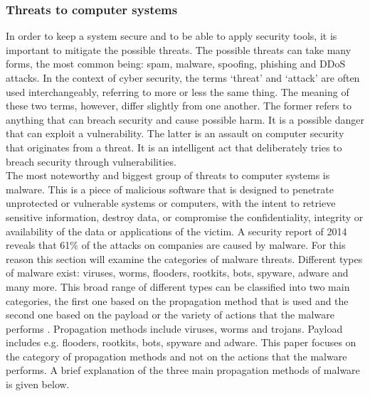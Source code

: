 \subsubsection{Threats to computer systems}


In order to keep a system secure and to be able to apply security tools, it is important to mitigate the possible threats. The possible threats can take many forms, the most common being: spam, malware, spoofing, phishing and  DDoS attacks.  In the context of cyber security, the terms `threat'  and `attack' are often used interchangeably, referring to more or less the same thing. The meaning of these two terms, however, differ slightly from one another. The former refers to anything that can breach security and cause possible harm. It is a possible danger that can exploit a vulnerability. The latter is an assault on computer security that originates from a threat. It is an intelligent act that deliberately tries to breach security through vulnerabilities.  \\

The most noteworthy and biggest group of threats to computer systems is malware. 
This is a piece of malicious software that is designed to penetrate unprotected or vulnerable systems or computers, with the intent to retrieve sensitive information, destroy data, or compromise the confidentiality, integrity or availability of the data or applications of the victim. A security report of 2014 \cite{SurveyKaspersky} reveals that 61\% of the attacks on companies are caused by malware. For this reason this section will examine the categories of malware threats. Different types of malware exist: viruses, worms, flooders, rootkits, bots, spyware, adware and many more. This broad range of different types can be classified into two main categories, the first one based on the propagation method that is used and the second one based on the payload or the variety of actions that the malware performs \cite{stallings2007network}. Propagation methods include viruses, worms and trojans. Payload includes e.g. flooders, rootkits, bots, spyware and adware. This paper focuses on the category of propagation methods and not on the actions that the malware performs. A brief explanation of the three main propagation methods of malware is given below.  


